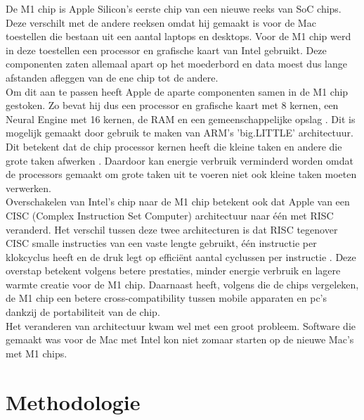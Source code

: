 \documentclass{hogent-article}
\begin{document}


De M1 chip is Apple Silicon's eerste chip van een nieuwe reeks van SoC chips. Deze verschilt met de andere reeksen omdat hij gemaakt is voor de Mac toestellen die bestaan uit een aantal laptops en desktops. Voor de M1 chip werd in deze toestellen een processor en grafische kaart van Intel gebruikt. Deze componenten zaten allemaal apart op het moederbord en data moest dus lange afstanden afleggen van de ene chip tot de andere. \\
Om dit aan te passen heeft Apple de aparte componenten samen in de M1 chip gestoken. Zo bevat hij dus een processor en grafische kaart met 8 kernen, een Neural Engine met 16 kernen, de RAM en een gemeenschappelijke opslag \autocite{Apple2020}. Dit is mogelijk gemaakt door gebruik te maken van ARM's 'big.LITTLE' architectuur. Dit betekent dat de chip processor kernen heeft die kleine taken en andere die grote taken afwerken \autocite{ARM2014}. Daardoor kan energie verbruik verminderd worden omdat de processors gemaakt om grote taken uit te voeren niet ook kleine taken moeten verwerken. \\
Overschakelen van Intel's chip naar de M1 chip betekent ook dat Apple van een CISC (Complex Instruction Set Computer) architectuur naar één met RISC veranderd. Het verschil tussen deze twee architecturen is dat RISC tegenover CISC smalle instructies van een vaste lengte gebruikt, één instructie per klokcyclus heeft en de druk legt op efficiënt aantal cyclussen per instructie \autocite{Thornton2018}. Deze overstap betekent volgens \textcite{Frazelle2021} betere prestaties, minder energie verbruik en lagere warmte creatie voor de M1 chip. Daarnaast heeft, volgens \textcite{Dalakoti2022} die de chips vergeleken, de M1 chip een betere cross-compatibility tussen mobile apparaten en pc's dankzij de portabiliteit van de chip. \\
Het veranderen van architectuur kwam wel met een groot probleem. Software die gemaakt was voor de Mac met Intel kon niet zomaar starten op de nieuwe Mac's met M1 chips.

\section{Methodologie}
\end{document}

